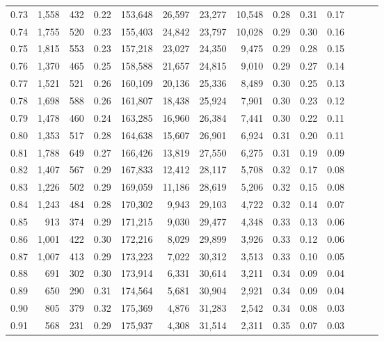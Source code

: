 \begin{tabular}{rrrrrrrrrrrrrr}
0.73 &  1,558 &  432 &  0.22 &  153,648 &   26,597 &  23,277 &  10,548 &  0.28 &  0.31 &      0.17 \\
0.74 &  1,755 &  520 &  0.23 &  155,403 &   24,842 &  23,797 &  10,028 &  0.29 &  0.30 &      0.16 \\
0.75 &  1,815 &  553 &  0.23 &  157,218 &   23,027 &  24,350 &   9,475 &  0.29 &  0.28 &      0.15 \\
0.76 &  1,370 &  465 &  0.25 &  158,588 &   21,657 &  24,815 &   9,010 &  0.29 &  0.27 &      0.14 \\
0.77 &  1,521 &  521 &  0.26 &  160,109 &   20,136 &  25,336 &   8,489 &  0.30 &  0.25 &      0.13 \\
0.78 &  1,698 &  588 &  0.26 &  161,807 &   18,438 &  25,924 &   7,901 &  0.30 &  0.23 &      0.12 \\
0.79 &  1,478 &  460 &  0.24 &  163,285 &   16,960 &  26,384 &   7,441 &  0.30 &  0.22 &      0.11 \\
0.80 &  1,353 &  517 &  0.28 &  164,638 &   15,607 &  26,901 &   6,924 &  0.31 &  0.20 &      0.11 \\
0.81 &  1,788 &  649 &  0.27 &  166,426 &   13,819 &  27,550 &   6,275 &  0.31 &  0.19 &      0.09 \\
0.82 &  1,407 &  567 &  0.29 &  167,833 &   12,412 &  28,117 &   5,708 &  0.32 &  0.17 &      0.08 \\
0.83 &  1,226 &  502 &  0.29 &  169,059 &   11,186 &  28,619 &   5,206 &  0.32 &  0.15 &      0.08 \\
0.84 &  1,243 &  484 &  0.28 &  170,302 &    9,943 &  29,103 &   4,722 &  0.32 &  0.14 &      0.07 \\
0.85 &    913 &  374 &  0.29 &  171,215 &    9,030 &  29,477 &   4,348 &  0.33 &  0.13 &      0.06 \\
0.86 &  1,001 &  422 &  0.30 &  172,216 &    8,029 &  29,899 &   3,926 &  0.33 &  0.12 &      0.06 \\
0.87 &  1,007 &  413 &  0.29 &  173,223 &    7,022 &  30,312 &   3,513 &  0.33 &  0.10 &      0.05 \\
0.88 &    691 &  302 &  0.30 &  173,914 &    6,331 &  30,614 &   3,211 &  0.34 &  0.09 &      0.04 \\
0.89 &    650 &  290 &  0.31 &  174,564 &    5,681 &  30,904 &   2,921 &  0.34 &  0.09 &      0.04 \\
0.90 &    805 &  379 &  0.32 &  175,369 &    4,876 &  31,283 &   2,542 &  0.34 &  0.08 &      0.03 \\
0.91 &    568 &  231 &  0.29 &  175,937 &    4,308 &  31,514 &   2,311 &  0.35 &  0.07 &      0.03 \\

\end{tabular}
